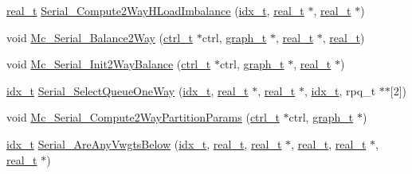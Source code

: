 \begin{DoxyCompactItemize}
\item 
\hyperlink{a00876_a1924a4f6907cc3833213aba1f07fcbe9}{real\+\_\+t} \hyperlink{a00951_a9d86e1452d22862f6c41fd07390cea54}{Serial\+\_\+\+Compute2\+Way\+H\+Load\+Imbalance} (\hyperlink{a00876_aaa5262be3e700770163401acb0150f52}{idx\+\_\+t}, \hyperlink{a00876_a1924a4f6907cc3833213aba1f07fcbe9}{real\+\_\+t} $\ast$, \hyperlink{a00876_a1924a4f6907cc3833213aba1f07fcbe9}{real\+\_\+t} $\ast$)
\item 
void \hyperlink{a00951_a5f868aede1c48f50a306ba7d46d8b42b}{Mc\+\_\+\+Serial\+\_\+\+Balance2\+Way} (\hyperlink{a00742}{ctrl\+\_\+t} $\ast$ctrl, \hyperlink{a00734}{graph\+\_\+t} $\ast$, \hyperlink{a00876_a1924a4f6907cc3833213aba1f07fcbe9}{real\+\_\+t} $\ast$, \hyperlink{a00876_a1924a4f6907cc3833213aba1f07fcbe9}{real\+\_\+t})
\item 
void \hyperlink{a00951_ae397fc4e64666390e696046f73e4e8e7}{Mc\+\_\+\+Serial\+\_\+\+Init2\+Way\+Balance} (\hyperlink{a00742}{ctrl\+\_\+t} $\ast$ctrl, \hyperlink{a00734}{graph\+\_\+t} $\ast$, \hyperlink{a00876_a1924a4f6907cc3833213aba1f07fcbe9}{real\+\_\+t} $\ast$)
\item 
\hyperlink{a00876_aaa5262be3e700770163401acb0150f52}{idx\+\_\+t} \hyperlink{a00951_aacd41e253622410ce03e435ce404435a}{Serial\+\_\+\+Select\+Queue\+One\+Way} (\hyperlink{a00876_aaa5262be3e700770163401acb0150f52}{idx\+\_\+t}, \hyperlink{a00876_a1924a4f6907cc3833213aba1f07fcbe9}{real\+\_\+t} $\ast$, \hyperlink{a00876_a1924a4f6907cc3833213aba1f07fcbe9}{real\+\_\+t} $\ast$, \hyperlink{a00876_aaa5262be3e700770163401acb0150f52}{idx\+\_\+t}, rpq\+\_\+t $\ast$$\ast$\mbox{[}2\mbox{]})
\item 
void \hyperlink{a00951_ab1a974be2bb795cbc91c0224b0c8ddcc}{Mc\+\_\+\+Serial\+\_\+\+Compute2\+Way\+Partition\+Params} (\hyperlink{a00742}{ctrl\+\_\+t} $\ast$ctrl, \hyperlink{a00734}{graph\+\_\+t} $\ast$)
\item 
\hyperlink{a00876_aaa5262be3e700770163401acb0150f52}{idx\+\_\+t} \hyperlink{a00951_ad7879274a6b65a679f0b7acf7ab84ca0}{Serial\+\_\+\+Are\+Any\+Vwgts\+Below} (\hyperlink{a00876_aaa5262be3e700770163401acb0150f52}{idx\+\_\+t}, \hyperlink{a00876_a1924a4f6907cc3833213aba1f07fcbe9}{real\+\_\+t}, \hyperlink{a00876_a1924a4f6907cc3833213aba1f07fcbe9}{real\+\_\+t} $\ast$, \hyperlink{a00876_a1924a4f6907cc3833213aba1f07fcbe9}{real\+\_\+t}, \hyperlink{a00876_a1924a4f6907cc3833213aba1f07fcbe9}{real\+\_\+t} $\ast$, \hyperlink{a00876_a1924a4f6907cc3833213aba1f07fcbe9}{real\+\_\+t} $\ast$)
\item 
$$
\end{DoxyCompactItemize}
